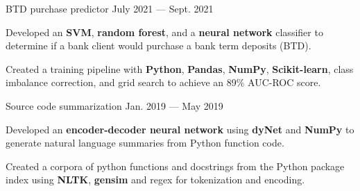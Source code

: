 
\vspace{-0.1cm}

\begin{cventries}

  \cventry
    {} %
    {BTD purchase predictor \href{https://github.com/pauldhein/marketing-campaign-classifier}{\faExternalLink}} %
    {July 2021 --- Sept. 2021} %
    {} %
    {
      \vspace{-1cm}
      \begin{cvitems} %
        \item Developed an \textbf{SVM}, \textbf{random forest}, and a \textbf{neural network} classifier to determine if a bank client would purchase a bank term deposits (BTD).
        \item Created a training pipeline with \textbf{Python}, \textbf{Pandas}, \textbf{NumPy}, \textbf{Scikit-learn}, class imbalance correction, and grid search to achieve an 89\% AUC-ROC score. 
      \end{cvitems}
    }
  \vspace{.2cm}
  \cventry
    {} %
    {Source code summarization \href{https://github.com/pauldhein/code-summarization}{\faExternalLink}} %
    {Jan. 2019 --- May 2019} %
    {} %
    {
      \vspace{-1cm}
      \begin{cvitems} %
        \item Developed an \textbf{encoder-decoder neural network} using \textbf{dyNet} and \textbf{NumPy} to generate natural language summaries from Python function code.
        \item Created a corpora of python functions and docstrings from the Python package index using \textbf{NLTK}, \textbf{gensim} and regex for tokenization and encoding.
      \end{cvitems}
    }

\end{cventries}
